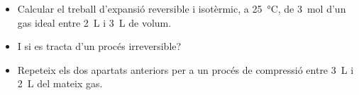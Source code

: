 \begin{exr}{}
    \begin{itemize}
        \item Calcular el treball d'expansió reversible i isotèrmic, a \qty{25}{\celsius}, de \qty{3}{\mol} d'un gas ideal entre \qty{2}{\liter} i \qty{3}{\liter} de volum.
        \item I si es tracta d'un procés irreversible?
        \item Repeteix els dos apartats anteriors per a un procés de compressió entre \qty{3}{\liter} i \qty{2}{\liter} del mateix gas.
    \end{itemize}
    \end{exr}
    

